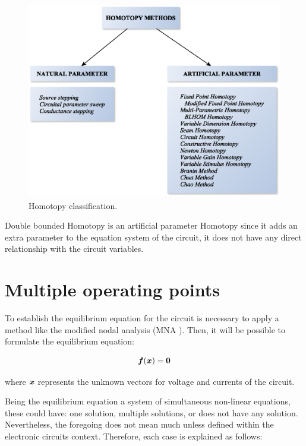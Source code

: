 \documentclass[conference,letterpaper,onecolumn]{IEEEtran}
\newcommand{\pig}[1]{\mbox{\boldmath ${#1}$}	}
\begin{document}
\begin{figure}[tbp]
\centering
\includegraphics[width=14cm]{figs/homotopy_clas.eps}
\caption{Homotopy classification.}
\label{construc}
\end{figure}

Double bounded Homotopy is an artificial parameter Homotopy since it adds an extra parameter to the equation system of the circuit, it does not have any direct relationship with the circuit variables.

\section{Multiple operating points}

To establish the equilibrium equation for the circuit is necessary to apply a method like the modified nodal analysis (MNA \cite{stat_1,mnaxx}). Then, it will be possible to formulate the equilibrium equation:

\begin{displaymath}
\pig{f}(\pig{x})=\pig{0}
\end{displaymath}

where $\pig{x}$ represents the unknown vectors for voltage and currents of the circuit.

Being the equilibrium equation a system of simultaneous non-linear equations, these could have: one solution, multiple solutions, or does not have any solution. Nevertheless, the foregoing does not mean much unless defined within the electronic circuits context. Therefore, each case is explained as follows: 
\end{document}
